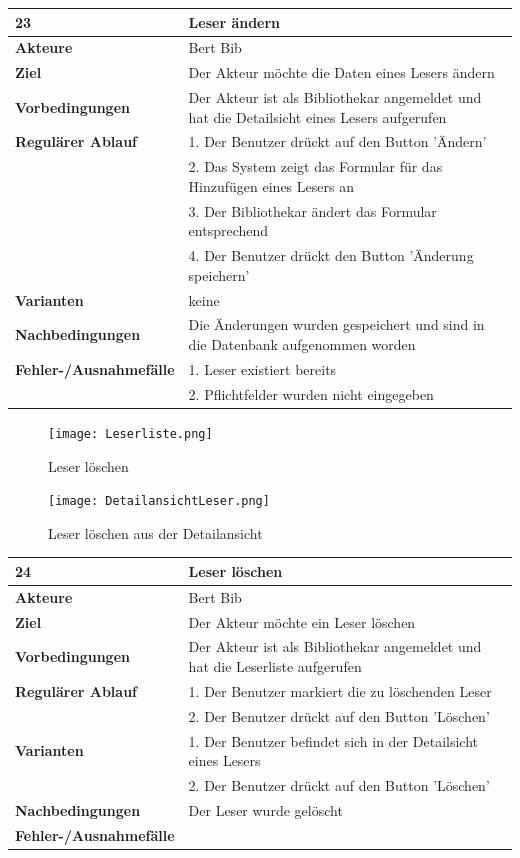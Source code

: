 \documentclass[fontsize=12pt,paper=a4,twoside]{scrartcl}
\begin{document}
\begin{table}
	[H] \label{23} 
	\begin{tabular}
		{|l|p{10cm}|} \hline \textbf{23} & \textbf{Leser ändern} \\
		\hline \textbf{Akteure} & Bert Bib\\
		\hline \textbf{Ziel} & Der Akteur möchte die Daten eines Lesers ändern \\
		\hline \textbf{Vorbedingungen} & Der Akteur ist als Bibliothekar angemeldet und hat die Detailsicht eines Lesers aufgerufen \\
		\hline \textbf{Regulärer Ablauf} & 1. Der Benutzer drückt auf den Button 'Ändern' \\
		&2. Das System zeigt das Formular für das Hinzufügen eines Lesers an\\
		&3. Der Bibliothekar ändert das Formular entsprechend\\
		&4. Der Benutzer drückt den Button 'Änderung speichern'\\
		\hline \textbf{Varianten} & keine \\
		\hline \textbf{Nachbedingungen} & Die Änderungen wurden gespeichert und sind in die Datenbank aufgenommen worden\\
		\hline \textbf{Fehler-/Ausnahmefälle} & 1. Leser existiert bereits\\
		&2. Pflichtfelder wurden nicht eingegeben\\
		\hline 
	\end{tabular}
\end{table}
\begin{figure}
	[H] \caption{Leser löschen} 
	\texttt{[image: Leserliste.png]} \label{pic:LeserLoeschen} 
\end{figure}
\begin{figure}
	[H] \caption{Leser löschen aus der Detailansicht} 
	\texttt{[image: DetailansichtLeser.png]} \label{pic:LeserLoeschenAusDetailans.} 
\end{figure}
\begin{table}
	[H] \label{24} 
	\begin{tabular}
		{|l|p{10cm}|} \hline \textbf{24} & \textbf{Leser löschen} \\
		\hline \textbf{Akteure} & Bert Bib\\
		\hline \textbf{Ziel} & Der Akteur möchte ein Leser löschen \\
		\hline \textbf{Vorbedingungen} & Der Akteur ist als Bibliothekar angemeldet und hat die Leserliste aufgerufen \\
		\hline \textbf{Regulärer Ablauf} & 1. Der Benutzer markiert die zu löschenden Leser\\
		&2. Der Benutzer drückt auf den Button 'Löschen' \\
		\hline \textbf{Varianten} & 1. Der Benutzer befindet sich in der Detailsicht eines Lesers\\
		&2. Der Benutzer drückt auf den Button 'Löschen' \\
		\hline \textbf{Nachbedingungen} & Der Leser wurde gelöscht \\
		\hline \textbf{Fehler-/Ausnahmefälle} & \\
		\hline 
	\end{tabular}
\end{table}
\end{document}
